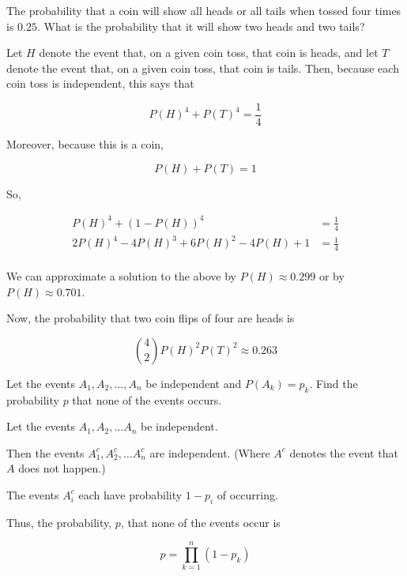 \begin{problem}[Handout 5, \# 12]
  The probability that a coin will show all heads or all tails when tossed
  four times is \(0.25\). What is the probability that it will show two
  heads and two tails?
\end{problem}
\begin{solution}
Let $H$ denote the event that, on a given coin toss, that coin is heads, and let $T$ denote the event that, on a given coin toss, that coin is tails. Then, because each coin toss is independent, this says that

\[
P(H)^4 + P(T)^4 = \frac{1}{4} 
\]

Moreover, because this is a coin,

\[
P(H) + P(T) = 1
\]

So,

\begin{align*}
P(H)^4 + (1-P(H))^4 &= \frac{1}{4} \\ 
2P(H)^4 -4P(H)^3 + 6P(H)^2 - 4P(H) +1 &= \frac{1}{4} \\
\end{align*}

We can approximate a solution to the above by $P(H) \approx 0.299$ or by $P(H) \approx 0.701$.

Now, the probability that two coin flips of four are heads is

\[
\binom{4}{2}P(H)^2P(T)^2 \approx 0.263
\]

\end{solution}
\newpage

\begin{problem}[Handout 5, \# 13]
  Let the events \(A_1, A_2,\dotsc,A_n\) be independent and
  \(P(A_k)=p_k\). Find the probability \(p\) that none of the events
  occurs.
\end{problem}
\begin{solution}

Let the events $A_1, A_2, \ldots A_n$ be independent.

Then the events $A_1^c, A_2^c, \ldots A_n^c$ are independent. (Where $A^c$ denotes the event that $A$ does not happen.)

The events $A_i^c$ each have probability $1-p_i$ of occurring.

Thus, the probability, $p$, that none of the events occur is

\[

p = \prod\limits_{k=1}^n (1-p_k)


\]
\end{solution}
\newpage

